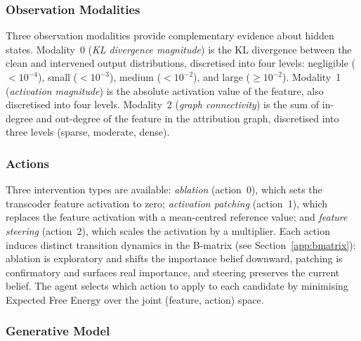 \subsubsection{Observation Modalities}

Three observation modalities provide complementary evidence about
hidden states.  Modality~0 (\emph{KL divergence magnitude}) is the
KL divergence between the clean and intervened output distributions,
discretised into four levels: negligible ($<10^{-4}$), small
($<10^{-3}$), medium ($<10^{-2}$), and large ($\geq 10^{-2}$).
Modality~1 (\emph{activation magnitude}) is the absolute activation
value of the feature, also discretised into four levels.  Modality~2
(\emph{graph connectivity}) is the sum of in-degree and out-degree
of the feature in the attribution graph, discretised into three
levels (sparse, moderate, dense).

\subsubsection{Actions}

Three intervention types are available: \emph{ablation} (action~0),
which sets the transcoder feature activation to zero;
\emph{activation patching} (action~1), which replaces the feature
activation with a mean-centred reference value; and
\emph{feature steering} (action~2), which scales the activation
by a multiplier.  Each action induces distinct transition dynamics
in the B-matrix (see Section~\ref{app:bmatrix}): ablation is
exploratory and shifts the importance belief downward, patching is
confirmatory and surfaces real importance, and steering preserves
the current belief.  The agent selects which action to apply to
each candidate by minimising Expected Free Energy over the joint
(feature, action) space.

\subsubsection{Generative Model}

